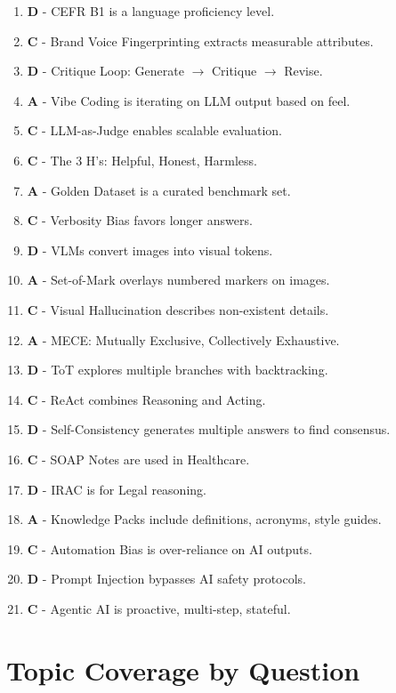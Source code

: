 \documentclass[11pt]{article}
\begin{document}
\begin{enumerate}
    \item \textbf{D} - CEFR B1 is a language proficiency level.
    \item \textbf{C} - Brand Voice Fingerprinting extracts measurable attributes.
    \item \textbf{D} - Critique Loop: Generate $\to$ Critique $\to$ Revise.
    \item \textbf{A} - Vibe Coding is iterating on LLM output based on feel.
    \item \textbf{C} - LLM-as-Judge enables scalable evaluation.
    \item \textbf{C} - The 3 H's: Helpful, Honest, Harmless.
    \item \textbf{A} - Golden Dataset is a curated benchmark set.
    \item \textbf{C} - Verbosity Bias favors longer answers.
    \item \textbf{D} - VLMs convert images into visual tokens.
    \item \textbf{A} - Set-of-Mark overlays numbered markers on images.
    \item \textbf{C} - Visual Hallucination describes non-existent details.
    \item \textbf{A} - MECE: Mutually Exclusive, Collectively Exhaustive.
    \item \textbf{D} - ToT explores multiple branches with backtracking.
    \item \textbf{C} - ReAct combines Reasoning and Acting.
    \item \textbf{D} - Self-Consistency generates multiple answers to find consensus.
    \item \textbf{C} - SOAP Notes are used in Healthcare.
    \item \textbf{D} - IRAC is for Legal reasoning.
    \item \textbf{A} - Knowledge Packs include definitions, acronyms, style guides.
    \item \textbf{C} - Automation Bias is over-reliance on AI outputs.
    \item \textbf{D} - Prompt Injection bypasses AI safety protocols.
    \item \textbf{C} - Agentic AI is proactive, multi-step, stateful.
\end{enumerate}

\vspace{1cm}

\section*{Topic Coverage by Question}
\end{document}
